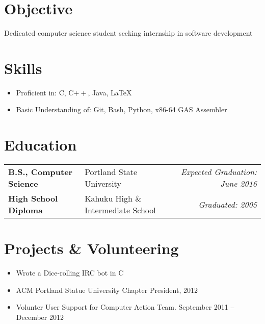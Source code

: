 \documentclass[letterpaper,11pt]{article}
\def\objective{Dedicated computer science student seeking internship in software development}
\newcommand{\education}{%
  \begin{tabular}{ llr }
}
\newcommand{\schoolentry}[3]{%
  \textbf{#1} & #2 & \emph{#3} \vspace{3pt} \\
}
\newcommand{\fineducation}{%
  \end{tabular}
}
\begin{document}
\section{Objective} \objective

\section{Skills}
  \begin{itemize}
    \item Proficient in: C, C$++$, Java, \LaTeX
    \item Basic Understanding of: Git, Bash, Python, x86-64 GAS Assembler
  \end{itemize}

\section{Education}
  \education
    \schoolentry{B.S., Computer Science}{Portland State University}{Expected Graduation: June 2016}
    \schoolentry{High School Diploma}{Kahuku High \& Intermediate School}{Graduated: 2005}
  \fineducation

\section{Projects \& Volunteering}
  \begin{itemize}[nosep,label=$\bullet$]
    \item Wrote a Dice-rolling IRC bot in C
    \item ACM Portland Statue University Chapter President, 2012
    \item Volunter User Support for Computer Action Team. September 2011 -- December 2012
  \end{itemize}
\end{document}
